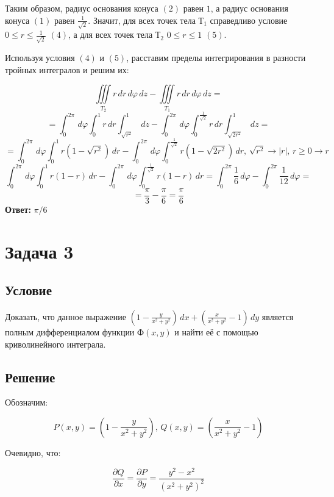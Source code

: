 \documentclass[12pt]{article}
\begin{document}
\begin{enumerate}[wide, labelwidth=!, labelindent=0pt]
		Таким образом, радиус основания конуса $ (2) $ равен $ 1 $, а радиус основания конуса $ (1) $ равен $ \frac{1}{\sqrt{2}} $. Значит, для всех точек тела $Т_1$ справедливо условие $0 \leq r \leq \frac{1}{\sqrt{2}}$	$ (4) $, а для всех точек тела $Т_2$ $0 \leq r \leq 1$	$ (5) $.
		
		Используя условия $ (4) $ и $ (5) $, расставим пределы интегрирования в разности тройных интегралов и решим их:
		
		$$ \iiint \limits_{T_2} r\,d r \,d \varphi \,d z - \iiint \limits_{T_1} r \,d r \,d \varphi \,d z =  $$
		$$ = \int_{0}^{2\pi} \,d \varphi \int_0^1 r \,dr \int_{\sqrt{r^2}}^1 \,dz  - \int_{0}^{2\pi} \,d \varphi \int_0^{\frac{1}{\sqrt{2}}} r \,dr \int_{\sqrt{2r^2}}^1 \,dz = $$
		$$ = \int_{0}^{2\pi} \,d \varphi \int_0^1 r (1-\sqrt{r^2}) \,dr  - \int_{0}^{2\pi} \,d \varphi \int_0^{\frac{1}{\sqrt{2}}} r (1-\sqrt{2r^2}) \,dr , \, \sqrt{r^2} \rightarrow |r|, \, r \geq 0  \rightarrow r$$
		$$ \int_{0}^{2\pi} \,d \varphi \int_0^1 r (1-r) \,dr  - \int_{0}^{2\pi} \,d \varphi \int_0^{\frac{1}{\sqrt{2}}} r (1-r) \,dr = \int_{0}^{2\pi} \frac{1}{6} \,d \varphi  - \int_{0}^{2\pi} \frac{1}{12} \,d \varphi =  $$
		$$ = \frac{\pi}{3}  - \frac{\pi}{6} = \frac{\pi}{6}   $$
		\hspace{290pt}\textbf{Ответ:} $ \pi/6 $	
	\end{enumerate}
	\newpage 
	
	\section*{Задача 3}	
	\subsection*{Условие}
	
	Доказать, что данное выражение $ (1-\frac{y}{x^2+y^2})\,dx + (\frac{x}{x^2+y^2}-1)\, dy $ является полным дифференциалом функции $ Ф(x,y) $ и найти её с помощью криволинейного интеграла.

	\subsection*{Решение}
	
	\indent Обозначим:

	$$ P(x,y) = (1-\frac{y}{x^2+y^2}) ,\, Q(x,y) = (\frac{x}{x^2+y^2}-1)$$

	Очевидно, что:

	$$ \frac{\partial Q}{\partial x} = \frac{\partial P}{\partial y}  = \frac{y^2 -x^2}{(x^2 + y^2)^2}$$
\end{document}
